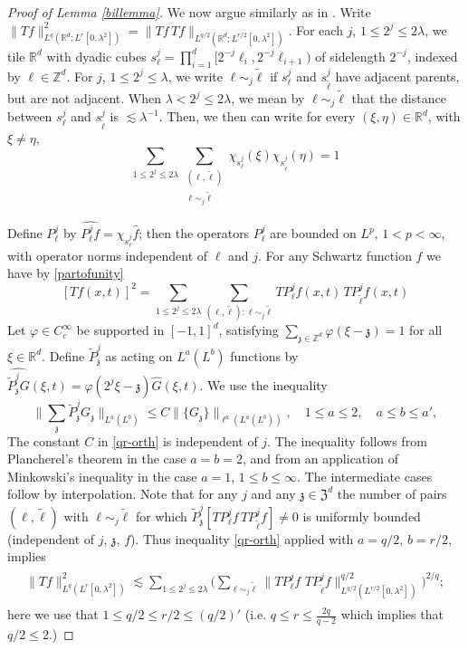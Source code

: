 \documentclass[11pt]{amsart}
\theoremstyle{definition}
\numberwithin{theorem}{section}
\numberwithin{definition}{section}
\numberwithin{equation}{section}
\def\tell{{\tilde \ell}}
\newcommand{\Be}{\begin{equation}}
\newcommand{\Ee}{\end{equation}}
\renewcommand{\le}{\leqslant}
\def\lc{\lesssim}
\def\la{\lambda}             \def\La{\Lambda}
\def\vphi{\varphi}
\def\fZ{{\mathfrak {Z}}}
\def\fz{{\mathfrak {z}}}
\def\bbR{{\mathbb {R}}}
\def\bbZ{{\mathbb {Z}}}
\renewcommand{\le}{\leqslant}
\begin{document}
\begin{proof}[Proof of Lemma \ref{billemma}]
We now argue  similarly as in \cite{tavave}. Write $\|T
f\|_{L^{q}(\mathbb R^d ;L^r[0,\la^2])}^2=\|Tf\,Tf\|_{L^{q/2}(\mathbb
R^d ;L^{r/2}[0,\la^2])}.$
For each $j$, $1\le 2^{j}\le 2\la$,  we  tile $\bbR^d$
 with dyadic cubes $ s _{\ell}^j=\prod_{i=1}^d [2^{-j}\ell_i, 2^{-j} \ell_{i+1})$
of sidelength $2^{-j}$, indexed by $\ell \in \bbZ^d$. For  $j$,
$1\le 2^{j}\le \la$, we write $\ell\sim_j\tell$ if $ s _{\ell}^j$ and
$ s _{\tell}^{j}$ have adjacent parents, but are not adjacent. When
$\la< 2^{j}\le 2\la$, we mean  by
$\ell\sim_j\tell$
that the distance between $ s _{\ell}^j$
and $ s _{\tell}^{j}$ is $\lesssim \la^{-1}$. Then, we then can write
for every $(\xi,\eta)\in \bbR^d$, with $\xi\neq \eta$,
\Be\label{partofunity}
\sum_{1\le 2^{j}\le 2\la} \sum_{\substack {(\ell,\tell)\\
\ell\sim_j\tell}}\chi_{ s _\ell^j}(\xi) \chi_{ s _\tell^j}(\eta)=1
\Ee



Define $P^j_\ell$ by $\widehat {P^j_\ell f}=
\chi_{ s _{\ell}^j}\widehat{f}$; then
the operators $P^j_\ell$ are bounded on $L^p$, $1<p<\infty$,
 with operator norms independent of $\ell$ and $j$.
For any
Schwartz function $f$
we have by \eqref{partofunity}
$$
[T f(x,t)]^2= \sum_{1\le 2^{j}\le 2\la} \sum_{(\ell,\tell):
\ell\sim_j\tell} T P_{\ell}^j f(x,t)\,T P_{\tell}^{j}f(x,t)
$$
Let $\vphi\in C^\infty_c$ be supported in $[-1,1]^d$, satisfying
 $\sum_{\fz\in\bbZ^d}\vphi(\xi-\fz)=1$ for all $\xi\in \bbR^d$. Define
$\widetilde P_\fz^j$ as acting on $L^a(L^b)$ functions by
$\widehat {\widetilde P_\fz^j G}(\xi,t)= \vphi(2^j\xi-\fz) \widehat G(\xi,t)$.
We use the inequality
\Be\label{qr-orth}
\Big\|\sum_{\fz} \widetilde P_{\fz}^j
G_\fz\Big\|_{L^a(L^b)}\le C
\big\|\{G_{\fz}\}\big\|_{\ell^{a}(L^a(L^b))},\quad
1\le a\le 2,\quad a\le b\le a',
\Ee
The constant $C$ in \eqref{qr-orth} is independent of $j$.
The inequality follows from  Plancherel's theorem in the case $a=b=2$,
and from an application of Minkowski's inequality in the case $a=1$, $1\le b\le \infty$. The intermediate cases follow by interpolation.
Note that for any $j$ and any $\fz\in \fZ^d$ the number of pairs $(\ell, \tell)$ with $\ell\sim_j \tell$ for which
$\widetilde P_{\fz}^j [T P_{\ell}^j f \,T P_{\tell}^{j}f]\neq 0$ is uniformly bounded
(independent of  $j$, $\fz$, $f$). Thus inequality
\eqref{qr-orth} applied with $a=q/2$, $b=r/2$,
implies
\begin{align}\label{uno}\begin{split}
\|T f\|^2_{L^{q}(L^r[0,\la^2])}\lc \sum_{1\le 2^{j}\le
2\la}\Big(\sum_{{\ell}\sim_j{\tell}}\|T P_{\ell}^jf\,\,T
P_{\tell}^{j}f\|^{q/2}_{L^{q/2}(L^{r/2}[0,\la^2])}\Big)^{2/q};
\end{split}\end{align}
here we use that
$1\le q/2\le r/2\le (q/2)'$
(i.e.  $q\le r\le \frac{2q}{q-2}$ which implies that $q/2\le 2$.)


\end{proof}
\end{document}
